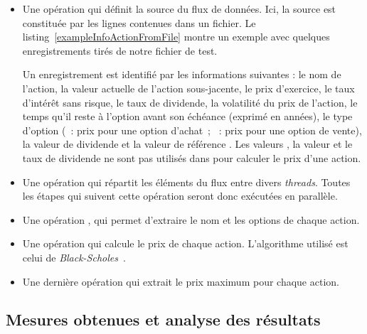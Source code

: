 \begin{itemize}

\item Une op\'eration qui d\'efinit la source du flux de donn\'ees. Ici, la source est constitu\'ee par les lignes contenues dans un fichier. Le listing~\ref{exampleInfoActionFromFile} montre un exemple avec quelques enregistrements tir\'es de notre fichier de test. 

Un enregistrement est identifi\'e par les informations suivantes : le nom de l'action, la valeur actuelle de l'action sous-jacente, le prix d'exercice, le taux d'int\'er\^et sans risque, le taux de dividende, la volatilit\'e du prix de l'action, le temps qu'il reste \`a l'option avant son \'ech\'eance (exprim\'e en ann\'ees), le type d'option (~: prix pour une option d'achat~; ~: prix pour une option de vente), la valeur de dividende et la valeur de r\'ef\'erence . 
Les valeurs , la valeur et le taux de dividende ne sont pas utilis\'es dans  pour calculer le prix d'une action.

\item Une op\'eration qui r\'epartit les \'el\'ements du flux entre divers \emph{threads}.
Toutes les \'etapes qui suivent cette op\'eration seront donc ex\'ecut\'ees en parall\`ele.

\item Une op\'eration  , qui permet d'extraire le nom et les options de chaque action.


\item  Une op\'eration qui calcule le prix de chaque action. L'algorithme utilis\'e est celui de \emph{Black-Scholes}~\citep{macbeth1979empirical}. 

\item Une derni\`ere op\'eration qui extrait le prix maximum pour chaque action.


\end{itemize}

\subsection{Mesures obtenues et analyse des r\'esultats}



